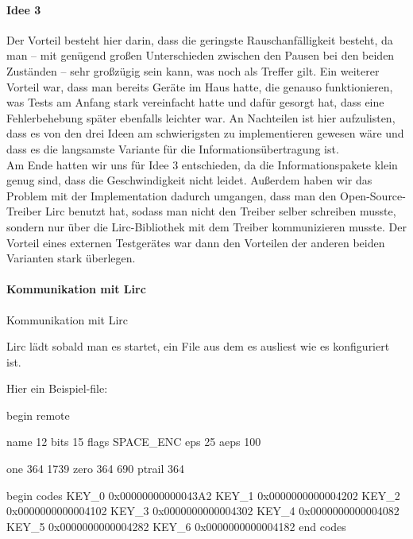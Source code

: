 \paragraph{Idee 3}
Der Vorteil besteht hier darin, dass die geringste Rauschanfälligkeit besteht, da man – mit genügend
großen Unterschieden zwischen den Pausen bei den beiden Zuständen – sehr großzügig sein kann, was
noch als Treffer gilt.
Ein weiterer Vorteil war, dass man bereits Geräte im Haus hatte, die genauso funktionieren, was
Tests am Anfang stark vereinfacht hatte und dafür gesorgt hat, dass eine Fehlerbehebung später
ebenfalls leichter war.
An Nachteilen ist hier aufzulisten, dass es von den drei Ideen am schwierigsten zu implementieren
gewesen wäre und dass es die langsamste Variante für die Informationsübertragung ist. \\

Am Ende hatten wir uns für Idee 3 entschieden, da die Informationspakete klein genug sind, dass
die Geschwindigkeit nicht leidet.
Außerdem haben wir das Problem mit der Implementation dadurch umgangen, dass man den
Open-Source-Treiber Lirc benutzt hat, sodass man nicht den Treiber selber schreiben musste, sondern
nur über die Lirc-Bibliothek mit dem Treiber kommunizieren musste.
Der Vorteil eines externen Testgerätes war dann den Vorteilen der anderen beiden Varianten stark
überlegen.

\paragraph{Kommunikation mit Lirc}
Kommunikation mit Lirc



Lirc lädt sobald man es startet, ein File aus dem es ausliest wie es konfiguriert ist.

Hier ein Beispiel-file:


begin remote

  name  12		   	
  bits           15  		
  flags SPACE_ENC			 	
  eps            25
  aeps          100

  one           364  1739
  zero          364   690
  ptrail        364

      begin codes
          KEY_0                    0x00000000000043A2        
          KEY_1                    0x0000000000004202        
          KEY_2                    0x0000000000004102        
          KEY_3                    0x0000000000004302        
          KEY_4                    0x0000000000004082       
          KEY_5                    0x0000000000004282        
          KEY_6                    0x0000000000004182        
      end codes

